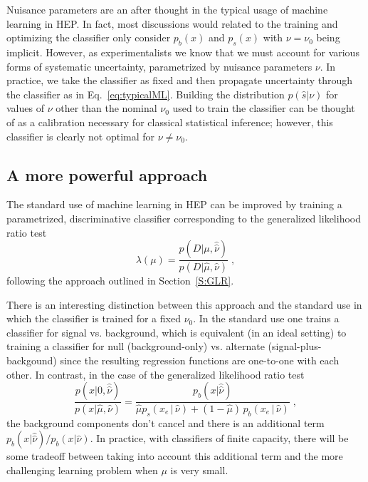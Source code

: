 \documentclass{article} %
\begin{document}
Nuisance parameters are an after thought in the typical usage of machine learning in HEP. In fact, most discussions would related to the training and optimizing the classifier only consider $p_b(x)$ and $p_s(x)$ with $\nu=\nu_0$ being implicit. However, as experimentalists we know that we must account for various forms of systematic uncertainty, parametrized by nuisance parameters $\nu$. In practice, we take the classifier as fixed and then propagate uncertainty through the classifier as in Eq.~\ref{eq:typicalML}. Building the distribution $p(\hat s|\nu)$ for values of $\nu$ other than the nominal $\nu_0$ used to train the classifier can be thought of as a calibration necessary for classical statistical inference; however, this classifier is clearly not optimal for $\nu \ne \nu_0$.

\subsection{A more powerful  approach}

The standard use of machine learning in HEP can be improved by training a parametrized, discriminative classifier corresponding to the generalized likelihood ratio test 
\begin{equation}
\lambda(\mu) = \frac{p(D|\mu, \hat{\hat{\nu}})}{p(D|\hat \mu, {\hat{\nu}})} \;,
\end{equation}
following the approach outlined in Section~\ref{S:GLR}. 

There is an interesting distinction between this approach and the standard use in which the classifier is trained for a fixed $\nu_0$. In the standard use one trains a classifier for signal vs. background, which is equivalent (in an ideal setting) to training a classifier for  null (background-only) vs. alternate (signal-plus-backgound) since the resulting regression functions are one-to-one with each other.
In contrast, in the case of the generalized likelihood ratio test 
\begin{equation}\label{eq:hep_improved}
 \frac{p(x| 0, \hat{\hat{ \nu}})}{p(x|\hat \mu, \hat\nu)} =  \frac{p_b(x| \hat{\hat{ \nu}})}{ \hat \mu p_s( x_e \, |\,  \hat\nu)  + (1- \hat \mu )\, p_b( x_e \,|\, \hat \nu)} \; ,
\end{equation}
the background components don't cancel and there is an additional term $p_b(x| \hat{\hat{ \nu}})/p_b(x| {\hat{ \nu}})$.
In practice, with classifiers of finite capacity, there will be some tradeoff between taking into account this additional term and the more challenging learning problem when $\mu$ is very small. 
\end{document}
